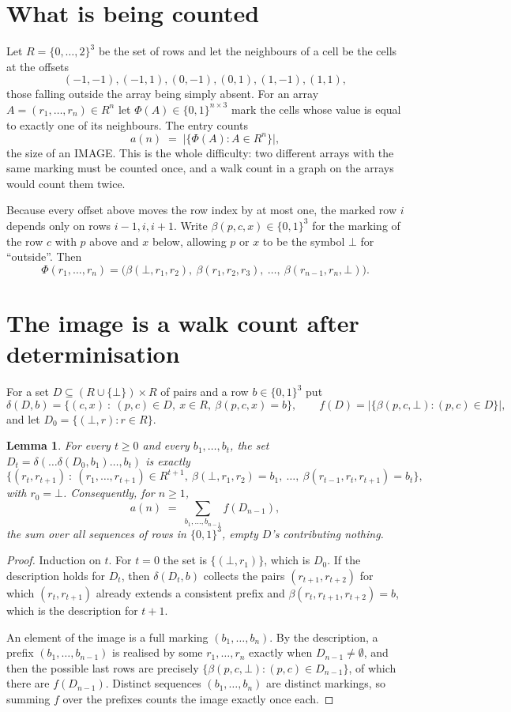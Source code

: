 \documentclass[11pt,a4paper]{article}
\theoremstyle{plain}
\newtheorem{lemma}[theorem]{Lemma}
\theoremstyle{definition}
\begin{document}
\section{What is being counted}

Let $R=\{0,\dots,2\}^{3}$ be the set of rows and let the neighbours of a cell be the
cells at the offsets
\[
(-1,-1), (-1,1), (0,-1), (0,1), (1,-1), (1,1),
\]
those falling outside the array being simply absent. For an array
$A=(r_1,\dots,r_n)\in R^n$ let $\Phi(A)\in\{0,1\}^{n\times3}$ mark the cells whose value
is equal to exactly one of its neighbours. The entry counts
\[
a(n)\;=\;\bigl|\{\Phi(A):A\in R^n\}\bigr| ,
\]
the size of an IMAGE. This is the whole difficulty: two different arrays with the same marking
must be counted once, and a walk count in a graph on the arrays would count them twice.

Because every offset above moves the row index by at most one, the marked row $i$ depends only
on rows $i-1,i,i+1$. Write $\beta(p,c,x)\in\{0,1\}^{3}$ for the marking of the row $c$
with $p$ above and $x$ below, allowing $p$ or $x$ to be the symbol $\bot$ for ``outside''.
Then
\[
\Phi(r_1,\dots,r_n)=\bigl(\beta(\bot,r_1,r_2),\ \beta(r_1,r_2,r_3),\ \dots,\
\beta(r_{n-1},r_n,\bot)\bigr).
\]

\section{The image is a walk count after determinisation}

For a set $D\subseteq(R\cup\{\bot\})\times R$ of pairs and a row $b\in\{0,1\}^{3}$ put
\[
\delta(D,b)=\{(c,x)\ :\ (p,c)\in D,\ x\in R,\ \beta(p,c,x)=b\},\qquad
f(D)=\bigl|\{\beta(p,c,\bot):(p,c)\in D\}\bigr| ,
\]
and let $D_0=\{(\bot,r):r\in R\}$.

\begin{lemma}\label{lem:det}
For every $t\ge0$ and every $b_1,\dots,b_t$, the set
$D_t=\delta(\dots\delta(D_0,b_1)\dots,b_t)$ is exactly
\[
\{(r_t,r_{t+1})\ :\ (r_1,\dots,r_{t+1})\in R^{t+1},\ \beta(\bot,r_1,r_2)=b_1,\ \dots,\
\beta(r_{t-1},r_t,r_{t+1})=b_t\} ,
\]
with $r_0=\bot$. Consequently, for $n\ge1$,
\[
a(n)\;=\;\sum_{b_1,\dots,b_{n-1}}f(D_{n-1}),
\]
the sum over all sequences of rows in $\{0,1\}^{3}$, empty $D$'s contributing nothing.
\end{lemma}

\begin{proof}
Induction on $t$. For $t=0$ the set is $\{(\bot,r_1)\}$, which is $D_0$. If the description
holds for $D_t$, then $\delta(D_t,b)$ collects the pairs $(r_{t+1},r_{t+2})$ for which
$(r_t,r_{t+1})$ already extends a consistent prefix and
$\beta(r_t,r_{t+1},r_{t+2})=b$, which is the description for $t+1$.

An element of the image is a full marking $(b_1,\dots,b_n)$. By the description, a prefix
$(b_1,\dots,b_{n-1})$ is realised by some $r_1,\dots,r_n$ exactly when $D_{n-1}\neq
\emptyset$, and then the possible last rows are precisely
$\{\beta(p,c,\bot):(p,c)\in D_{n-1}\}$, of which there are $f(D_{n-1})$. Distinct
sequences $(b_1,\dots,b_n)$ are distinct markings, so summing $f$ over the prefixes counts the
image exactly once each.
\end{proof}
\end{document}
